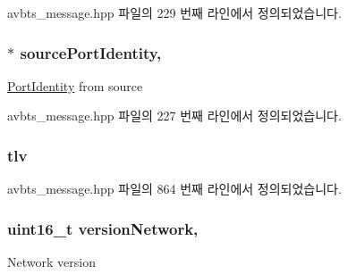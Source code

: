 avbts\+\_\+message.\+hpp 파일의 229 번째 라인에서 정의되었습니다.

\subsubsection[{\texorpdfstring{source\+Port\+Identity}{sourcePortIdentity}}]{$\ast$ source\+Port\+Identity\hspace{0.3cm}{\ttfamily [protected]}, {\ttfamily [inherited]}}\hypertarget{class_p_t_p_message_common_a415b5544bdd3ea41dae460fa1af900d9}{}\label{class_p_t_p_message_common_a415b5544bdd3ea41dae460fa1af900d9}
\hyperlink{class_port_identity}{Port\+Identity} from source 

avbts\+\_\+message.\+hpp 파일의 227 번째 라인에서 정의되었습니다.

\subsubsection[{\texorpdfstring{tlv}{tlv}}]{ tlv\hspace{0.3cm}{\ttfamily [private]}}\hypertarget{class_p_t_p_message_follow_up_adb3aa00a5c7072f30af7374ea54c158c}{}\label{class_p_t_p_message_follow_up_adb3aa00a5c7072f30af7374ea54c158c}


avbts\+\_\+message.\+hpp 파일의 864 번째 라인에서 정의되었습니다.

\subsubsection[{\texorpdfstring{version\+Network}{versionNetwork}}]{\setlength{\rightskip}{0pt plus 5cm}uint16\+\_\+t version\+Network\hspace{0.3cm}{\ttfamily [protected]}, {\ttfamily [inherited]}}\hypertarget{class_p_t_p_message_common_a79d99d7b79ee6ad4bbd03b301ccccb53}{}\label{class_p_t_p_message_common_a79d99d7b79ee6ad4bbd03b301ccccb53}
Network version 

